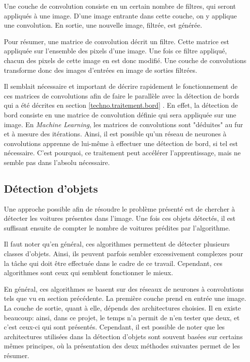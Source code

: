 Une couche de convolution consiste en un certain nombre de filtres, qui seront appliqués à une image. D'une image entrante dans cette couche, on y applique une convolution. En sortie, une nouvelle image, filtrée, est générée.

Pour résumer, une matrice de convolution décrit un filtre. Cette matrice est appliquée sur l'ensemble des pixels d'une image. Une fois ce filtre appliqué, chacun des pixels de cette image en est donc modifié. Une couche de convolutions transforme donc des images d'entrées en image de sorties filtrées.

Il semblait nécessaire et important de décrire rapidement le fonctionnement de ces matrices de convolutions afin de faire le parallèle avec la détection de bords qui a été décrites en section \ref{techno.traitement.bord} . En effet, la détection de bord consiste en une matrice de convolution définie qui sera appliquée sur une image. En \textit{Machine Learning}, les matrices de convolutions sont "déduites" au fur et à mesure des itérations. Ainsi, il est possible qu'un réseau de neurones à convolutions apprenne de lui-même à effectuer une détection de bord, si tel est nécessaire. C'est pourquoi, ce traitement peut accélérer l'apprentissage, mais ne semble pas dans l'absolu nécessaire.

\subsection{Détection d'objets}\label{techno.nn.object}

Une approche possible afin de résoudre le problème présenté est de chercher à détecter les voitures présentes dans l'image. Une fois ces objets détectés, il est suffisant ensuite de compter le nombre de voitures prédites par l'algorithme. 

Il faut noter qu'en général, ces algorithmes permettent de détecter plusieurs classes d'objets. Ainsi, ils peuvent parfois sembler excessivement complexes pour la tâche qui doit être effectuée dans le cadre de ce travail. Cependant, ces algorithmes sont ceux qui semblent fonctionner le mieux.

En général, ces algorithmes se basent sur des réseaux de neurones à convolutions tels que vu en section précédente. La première couche prend en entrée une image. La couche de sortie, quant à elle, dépends des architectures choisies. Il en existe beaucoup: ainsi, dans ce projet, le temps n'a permit de n'en tester que deux, et c'est ceux-ci qui sont présentés. Cependant, il est possible de noter que les architectures utilisées dans la détection d'objets sont souvent basées sur certains mêmes principes, où la présentation des deux méthodes suivantes permet de les résumer. 

